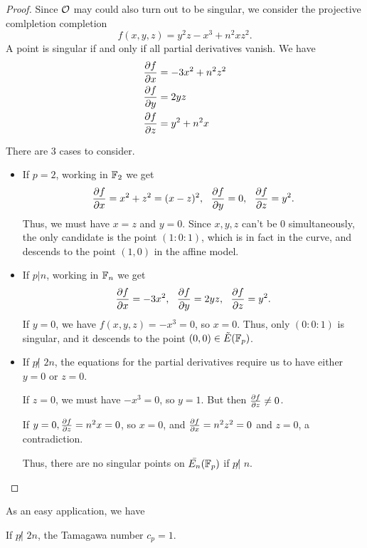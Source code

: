 \documentclass[12pt, a4paper]{amsart}
\begin{document}
\begin{proof}
  Since ${\mathcal O}$ may could also turn out to be singular, we consider
  the projective comlpletion completion
  \[f(x,y,z) = y^2z - x^3 + n^2 xz^2.\]
  A point is singular if and only if all partial derivatives vanish.
  We have
  \begin{equation*}
    \begin{split}
      \frac{\partial f}{\partial x} &= -3x^2 + n^2z^2 \\
      \frac{\partial f}{\partial y} &= 2yz \\
      \frac{\partial f}{\partial z} &= y^2 + n^2x
    \end{split}
  \end{equation*}
 
  There are 3 cases to consider.
  
  \begin{itemize}
  \item If $p = 2$, working in $\mathbb{F}_2$ we get
    \[\frac{\partial f}{\partial x} = x^2+z^2 = (x-z)^2, \,\,\,\,
      \frac{\partial f}{\partial y} = 0, \,\,\,\,
      \frac{\partial f}{\partial z} = y^2.\]
    Thus, we must have $x = z$ and $ y = 0$. Since $x, y, z$ can't be 0
    simultaneously, the only candidate is the point $(1:0:1)$, which
    is in fact in the curve, and descends to the point $(1,0)$ in the
    affine model.
    
  \item If $p | n$, working in $\mathbb{F}_n$ we get
    \[  \frac{\partial f}{\partial x} = -3x^2, \,\,\,\,
        \frac{\partial f}{\partial y} = 2yz, \,\,\,\,
        \frac{\partial f}{\partial z} = y^2.
      \]
    If $y = 0$, we have $f(x,y,z) = -x^3 = 0$, so $x = 0$.
    Thus,  only $(0:0:1)$ is singular, and it descends to the point $(0,0) \in {\tilde{E}(\mathbb{F}_p)}$.

  \item If $p \not| \,\, 2n$, the equations for the partial derivatives
    require us to have either $y = 0$ or $z = 0$.
   
    If $z = 0$, we must have $-x^3 = 0$, so $y = 1$. But then $\frac{\partial f}{\partial z}
    \neq 0$.

    If $y = 0, \frac{\partial f}{\partial z} = n^2x = 0$, so $x = 0$, and $\frac{\partial f}{\partial x} =
    n^2z^2 = 0$ and $ z = 0$, a contradiction.

    Thus, there are no singular points on $\bar{E_n}(\mathbb{F}_p)$ if $p \not|
    \,\, n$. \qedhere
  \end{itemize}
\end{proof}

As an easy application, we have

\begin{cor}
  If $p \not| \,\, 2n$, the Tamagawa number $c_p = 1$.
\end{cor}
\end{document}
